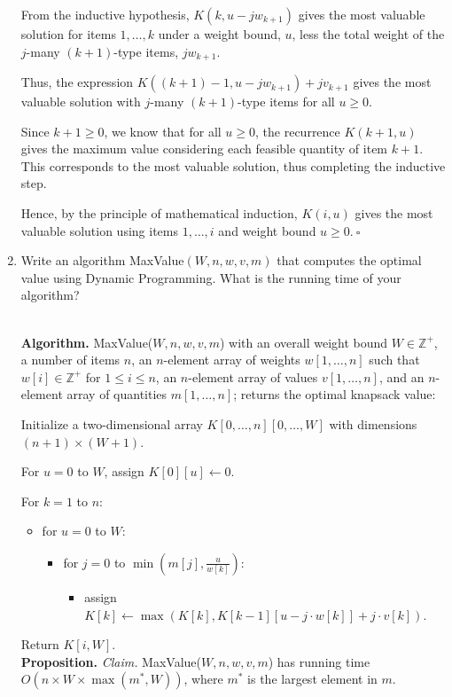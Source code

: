 \begin{enumerate}
\begin{solution}
From the inductive hypothesis, $K(k,u-jw_{k+1})$ gives the most valuable solution for items $1,\dots,k$ under a weight bound, $u$, less the total weight of the $j$-many $(k+1)$-type items, $jw_{k+1}$.

Thus, the expression $K((k+1)-1,u-jw_{k+1})+jv_{k+1}$ gives the most valuable solution with $j$-many $(k+1)$-type items for all $u\geq 0$.

Since $k+1\geq 0$, we know that for all $u\geq 0$, the recurrence $K(k+1,u)$ gives the maximum value considering each feasible quantity of item $k+1$. This corresponds to the most valuable solution, thus completing the inductive step.

Hence, by the principle of mathematical induction, $K(i,u)$ gives the most valuable solution using items $1,\dots,i$ and weight bound $u\geq 0$.$~\square$
\end{solution}
\item Write an algorithm {\sc MaxValue}$(W,n,w,v,m)$ that computes the optimal value using Dynamic Programming. What is the running time of your algorithm?
\begin{solution}\\

\textbf{Algorithm. }{\sc MaxValue}($W,n,w,v,m$) with an overall weight bound $W\in\mathbb{Z}^+$, a number of items $n$, an $n$-element array of weights $w[1,\dots,n]$ such that $w[i]\in\mathbb{Z}^+$ for $1\leq i\leq n$, an $n$-element array of values $v[1,\dots,n]$, and an $n$-element array of quantities $m[1,\dots,n]$; returns the optimal knapsack value:

Initialize a two-dimensional array $K[0,\dots,n][0,\dots,W]$ with dimensions $(n+1)\times(W+1)$.

For $u=0$ to $W$, assign $K[0][u]\leftarrow 0$.

For $k=1$ to $n$:
\begin{itemize}
\item for $u=0$ to $W$:
\begin{itemize}
\item for $j=0$ to $\min\left(m[j],\frac{u}{w[k]}\right)$:
\begin{itemize}
\item assign $K[k]\leftarrow\max(K[k],K[k-1][u-j\cdot w[k]]+j\cdot v[k])$.
\end{itemize}
\end{itemize}
\end{itemize}
Return $K[i,W]$.\\

\textbf{Proposition. }\textit{Claim. }{\sc MaxValue}($W,n,w,v,m$) has running time $O(n\times W\times\max(m^*,W))$, where $m^*$ is the largest element in $m$.


\end{solution}
\end{enumerate}
